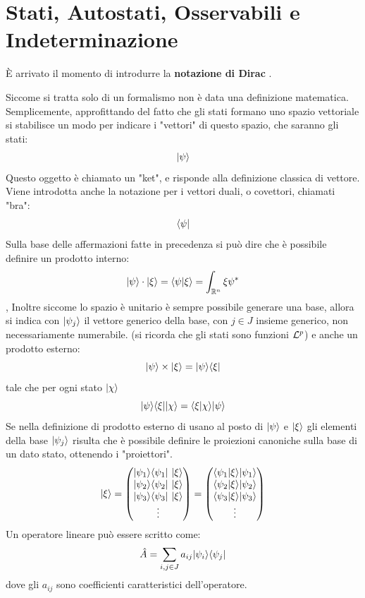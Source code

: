 \section{Stati, Autostati, Osservabili e Indeterminazione}
È arrivato il momento di introdurre la \textbf{notazione di Dirac} .

Siccome si tratta solo di un formalismo non è data una definizione matematica. Semplicemente, approfittando del fatto che gli stati formano uno spazio vettoriale si stabilisce un modo per indicare i "vettori" di questo spazio, che saranno gli stati:
\[
	|\psi \ket
\]
Questo oggetto è chiamato un "ket", e risponde alla definizione classica di vettore. Viene introdotta anche la notazione per i vettori duali, o covettori, chiamati "bra":
\[
	\bra \psi |
\]
Sulla base delle affermazioni fatte in precedenza si può dire che è possibile definire un prodotto interno:
\[
	|\psi\ket \cdot |\xi\ket = \braket \psi \xi = \rnint \xi \psi^*
\],
Inoltre siccome lo spazio è unitario è sempre possibile generare una base, allora si indica con $|\psi_j\ket$ il vettore generico della base, con $j \in J$ insieme generico, non necessariamente numerabile.
(si ricorda che gli stati sono funzioni $\L^p$) e anche un prodotto esterno:
\[
	\Ket \psi \times \Ket \xi = \ketbra \psi \xi
\]
tale che per ogni stato $\Ket \chi$
\[
	\ketbra \psi \xi \Ket \chi = \braket \xi \chi \Ket \psi
\]
Se nella definizione di prodotto esterno di usano al posto di $\Ket \psi$ e $\Ket \xi$ gli elementi della base $\Ket {\psi_j}$ risulta che è possibile definire le proiezioni canoniche sulla base di un dato stato, ottenendo i "proiettori".
\[
	\Ket \xi = 
	\begin{pmatrix}
		\ketbra{\psi_1}{\psi_1}\ \Ket{\xi} \\
		\ketbra{\psi_2}{\psi_2}\ \Ket{\xi} \\
		\ketbra{\psi_3}{\psi_3}\ \Ket{\xi} \\
		\vdots
	\end{pmatrix}
	= 
	\begin{pmatrix}
		\crossToScalket{\psi_1}{\psi_1}{\xi} \\
		\crossToScalket{\psi_2}{\psi_2}{\xi} \\
		\crossToScalket{\psi_3}{\psi_3}{\xi} \\
		\vdots
	\end{pmatrix}
\]
Un operatore lineare può essere scritto come:
\[
	\hat A = \sum_{i,j \in J} a_{ij} \ketbra{\psi_i}{\psi_j}
\]
dove gli $a_{ij}$ sono coefficienti caratteristici dell'operatore.\\
